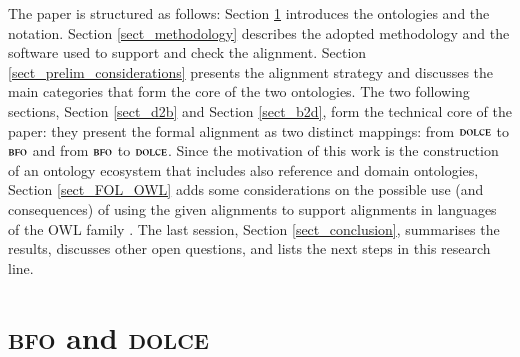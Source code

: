 \documentclass[ao]{iosart2x}
\newcommand{\nb}[1]{\textcolor{red}{$|$}\marginpar{\hspace*{-0cm}\parbox{20mm}{\scriptsize\raggedright\textcolor{red}{#1}}}}
\newcommand{\dolce}{{\textsc{dolce}}}
\newcommand{\bfo}{{\textsc{bfo}}}
\begin{document}
The paper is structured as follows: 
Section \ref{sect_bfo_and_dolce} introduces the ontologies and the notation. %
Section \ref{sect_methodology} describes the adopted methodology and the software used to support and check the alignment. 
Section \ref{sect_prelim_considerations} presents the alignment strategy and discusses the main categories that form the core of the two ontologies. 
The two following sections, Section \ref{sect_d2b} and Section \ref{sect_b2d}, form the technical core of the paper: they present the formal alignment as two distinct mappings: from $\dolce$ to $\bfo$ and from $\bfo$ to $\dolce$. 
Since the motivation of this work is the construction of an ontology ecosystem that includes also reference and domain ontologies, Section \ref{sect_FOL_OWL} adds some considerations on the possible use (and consequences) of using the given alignments to support alignments in languages of the OWL family \citep{owlref}. 
The last session, Section \ref{sect_conclusion}, summarises the results, discusses other open questions, and lists the next steps in this research line.


\section{{\bfo} and {\dolce}}
\label{sect_bfo_and_dolce}

\end{document}
